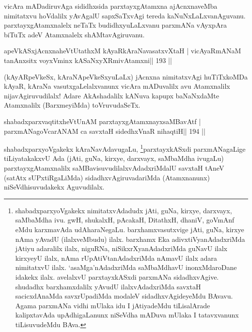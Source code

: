 \begin{artha}
vicAra mADadiruvAga sididhxsida parxtayxgAtamxna ajAcnxnaveMba nimitatxvu hoVdalilx yAvAgalU sapxSaTxvAgi tereda kaNuNxLaLxvanAguvanu. parxtayxgAtamxnalelx neTaTx budidhxyuLaLxvanu parxmANa vAyxpAra biTuTx adeV Atamxnalelx shAMtavAgiruvanu.
\end{artha}

\begin{shl}
apeVkASxjAcnxnaheVtUtathxM kAyaRkAraNavasatxvXtaH |
vicAyaRmANaM tanAnxsitx voyxVminx kASaNxyXRmivA\s\s tamxni\hfill || 193 ||
\end{shl}

\begin{artha}
(kAyARpeVkeSx, kAraNApeVkeSxyuLaLx) jAcnxna nimitatxvAgi huTiTxkoMDa kAyaR, kAraNa vasutxgaLelalxvanunx vicAra mADuvalilx avu Atamxnalilx nijavAgiruvudilalx! Adare AkAshadalilx  kANuva kapupx baNaNxdaMte Atamxnalilx (BarxmeyiMda) toVruvudaSeTx.
\end{artha}


\begin{shl}
shabadxparxvaqtitxheVtUnAM parxtayxgAtamxnayxsaMBavAtf |
parxmANagoVcarANAM ca savxtaH sidedhxVnaR nihaqtiH\hfill || 194 ||
\end{shl}

\begin{artha}
shabadxparxyoVgakekx
kAraNavAdavugaLu, \footnote{shabadxparxyoVgakekx nimitatxvAdadudx
  jAti, guNa, kirxye, darxvayx, saMbaMdha ivu. gwH, shukalxH, pAcakaH,
DitathxH, dhaniV, goVmAnf eMdu karxmavAda udAharaNegaLu.
barxhamxvasutxvige jAti, guNa, kirxye nAma yAvadU (ilalxveMbudu) ilalx.
barxhamx Eka adivxtiVyanAdadxriMda jAtiyu adaralilx ilalx, niguRNa,
niSikxrXyanAdadxriMda guNavU ilalx kirxyeyU ilalx, nAma
rUpAtiVtanAdadxriMda nAmavU ilalx adara nimitatxvU ilalx.
`asaMga'nAdadxriMda saMbaMdhavU inonxMdaroDane idakekx
ilalx. avelalxvU parxtayxkASxdi parxmANa sidadhxvAgive. shudadhx
barxhamxdalilx yAvudU ilalxvAdadxriMda savxtaH sacicxdAnaMda savxrUpadiMda
modaleV sidadhxvAgideyeMdu BAvavu. Agama parxmANa vidhi mUlaka idu I
jAtiyadeMdu tiLisalArade kalipxtavAda upAdhigaLanunx niSeVdha mADuva
mUlaka I tatavxvanunx tiLisuvudeMdu BAva.}parxtayxkASxdi
parxmANagaLige tiLiyatakakxvU Ada (jAti, guNa, kirxye, darxvayx,
saMbaMdha ivugaLu) parxtayxgAtamxnalilx saMBavisuvudilalxvAdadxriMdalU
savxtaH tAneV (satAtx sUPxtiRgaLiMda) sidadhxvAgiruvadariMda
(Atamxnanunx) niSeVdhisuvudakekx Aguvudilalx.
\end{artha}

